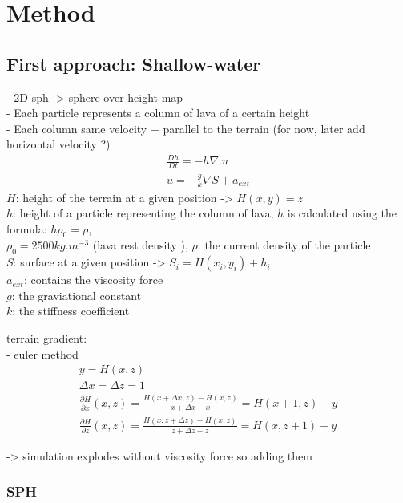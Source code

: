 \section{Method}

\subsection{First approach: Shallow-water}

- 2D sph -> sphere over height map\\
- Each particle represents a column of lava of a certain height\\
- Each column same velocity + parallel to the terrain (for now, later add horizontal velocity ?)\\

\begin{align}
    \frac{Dh}{Dt} = -h\nabla.u\\
    u = -\frac{g}{k}\nabla{S} + a_{ext}
\end{align}
$H$: height of the terrain at a given position -> $H(x,y) = z$\\
$h$: height of a particle representing the column of lava, $h$ is calculated using the formula: 
$h \rho_0 = \rho$,\\ 
$\rho_0 = 2500 kg.m^{-3}$ (lava rest density \cite{Griffiths}), $\rho$: the current density of the particle\\
$S$: surface at a given position -> $S_i = H(x_i,y_i) + h_i$\\
$a_{ext}$: contains the viscosity force\\
$g$: the graviational constant\\
$k$: the stiffness coefficient


terrain gradient:\\
- euler method 
\begin{gather*}
    y = H(x,z)\\
    \Delta{x} = \Delta{z} = 1\\
   \frac{\partial H}{\partial x} (x,z) = \frac{H(x+\Delta{x}, z) - H(x,z)}{x+\Delta{x}-x} = H(x+1, z) - y\\
   \frac{\partial H}{\partial z} (x,z) = \frac{H(x, z+\Delta{z}) - H(x,z)}{z+\Delta{z}-z} = H(x, z+1) - y
\end{gather*}

-> simulation explodes without viscosity force so adding them 

\subsubsection{SPH}

